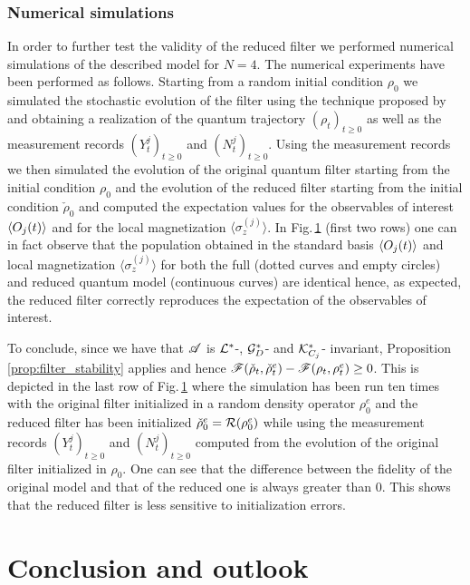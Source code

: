 \documentclass[aihp,12pt]{imsart}
\begin{document}
\begin{figure}[th]
    \label{fig:numerical_simulation}
\end{figure}

\subsubsection{Numerical simulations}
In order to further test the validity of the reduced filter we performed numerical simulations of the described model for $N=4$. 
The numerical experiments have been performed as follows. Starting from a random initial condition $\rho_0$ we simulated the stochastic evolution of the filter using the technique proposed by \cite{rouchon_efficient_2015} and obtaining a realization of the quantum trajectory $(\rho_t)_{t\geq 0}$ as well as the measurement records $(Y_t^j)_{t\geq0}$ and $(N_t^j)_{t\geq 0}$. Using the measurement records we then simulated the evolution of the original quantum filter starting from the initial condition $\rho_0$ and the evolution of the reduced filter starting from the initial condition $\check{\rho}_0$ and computed the expectation values for the observables of interest $\left< O_j(t) \right>$ and for the local magnetization $\langle{\sigma_z^{(j)}}\rangle$. In Fig.\,\ref{fig:numerical_simulation} (first two rows) one can in fact observe that the population obtained in the standard basis $\left< O_j(t) \right>$ and local magnetization $\langle\sigma_z^{(j)}\rangle$ for both the full (dotted curves and empty circles) and reduced quantum model (continuous curves) are identical hence, as expected, the reduced filter correctly reproduces the expectation of the observables of interest. 

To conclude, since we have that $\mathscr{A}$ is $\mathcal{L}^*$-, $\mathcal{G}_D^*$- and $\mathcal{K}_{C_j}^*$- invariant, Proposition \ref{prop:filter_stability} applies and hence $\mathscr{F}(\check{\rho}_t,\check{\rho}_t^e)-\mathscr{F}(\rho_t,\rho_t^e)\geq0$. This is depicted in the last row of Fig.\,\ref{fig:numerical_simulation} where the simulation has been run ten times with the original filter initialized in a random density operator $\rho_0^e$ and the reduced filter has been initialized $\check{\rho}_0^e = \mathcal{R}(\rho_0^e)$ while using the measurement records $(Y_t^j)_{t\geq0}$ and $(N_t^j)_{t\geq 0}$ computed from the evolution of the original filter initialized in $\rho_0$. One can see that the difference between the fidelity of the original model and that of the reduced one is always greater than 0. This shows that the reduced filter is less sensitive to initialization errors. 

\section{Conclusion and outlook}
\end{document}
